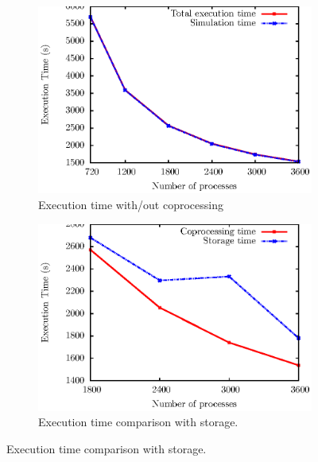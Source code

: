 \begin{figure}
        \begin{subfigure}[b]{0.40\linewidth}
          \includegraphics[scale=0.60]{pictures/test12.ps}
                \caption{Execution time with/out coprocessing}
                \label{fig:204copro}
        \end{subfigure}%

        \begin{subfigure}[b]{0.40\linewidth}
                \includegraphics[scale=0.60]{pictures/test22.ps}
                \caption{Execution time comparison with storage.}
                \label{fig:204ensight}
        \end{subfigure}


\end{figure}
